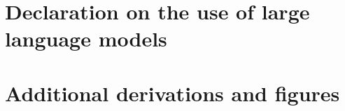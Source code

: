 \documentclass[aps,rmp,reprint,amsmath,amssymb,graphicx,longbibliography]{revtex4-1}
\begin{document}
\section*{Declaration on the use of large language models}

\appendix
\section{Additional derivations and figures}


\end{document}
